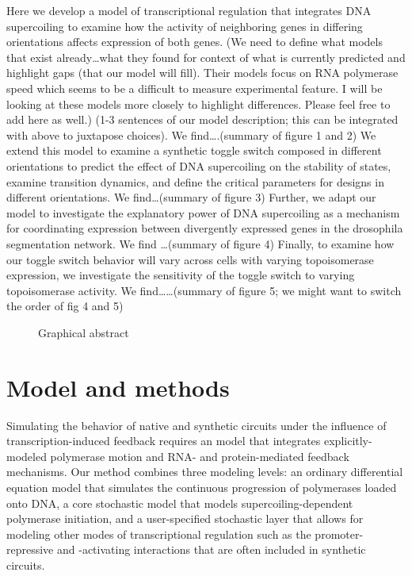 \documentclass[11pt]{article}
\begin{document}
Here we develop a model of transcriptional regulation that integrates DNA supercoiling to examine how the activity of neighboring genes in differing orientations affects expression of both genes.
(We need to define what models that exist already…what they found for context of what is currently predicted and highlight gaps (that our model will fill). Their models focus on RNA polymerase speed which seems to be a difficult to measure experimental feature. I will be looking at these models more closely to highlight differences. Please feel free to add here as well.)
(1-3 sentences of our model description; this can be integrated with above to juxtapose choices).
We find….(summary of figure 1 and 2)
We extend this model to examine a synthetic toggle switch composed in different orientations to predict the effect of DNA supercoiling on the stability of states, examine transition dynamics, and define the critical parameters for designs in different orientations. We find…(summary of figure 3)
Further, we adapt our model to investigate the explanatory power of DNA supercoiling as a mechanism for coordinating expression between divergently expressed genes in the drosophila segmentation network. We find …(summary of figure 4)
Finally, to examine how our toggle switch behavior will vary across cells with varying topoisomerase expression, we investigate the sensitivity of the toggle switch to varying topoisomerase activity. We find……(summary of figure 5; we might want to switch the order of fig 4 and 5)

\begin{figure}[h]
    \centering
    \caption{Graphical abstract} \label{fig:graphical_abstract}
\end{figure}

\section{Model and methods}
Simulating the behavior of native and synthetic circuits under the influence of transcription-induced feedback requires an model that integrates explicitly-modeled polymerase motion and RNA- and protein-mediated feedback mechanisms.
Our method combines three modeling levels: an ordinary differential equation model that simulates the continuous progression of polymerases loaded onto DNA, a core stochastic model that models supercoiling-dependent polymerase initiation, and a user-specified stochastic layer that allows for modeling other modes of transcriptional regulation such as the promoter-repressive and -activating interactions that are often included in synthetic circuits.
\end{document}
